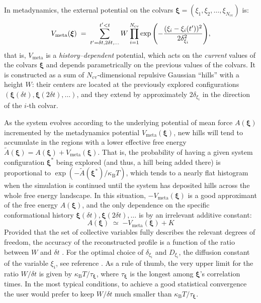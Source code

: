 In metadynamics, the external potential on the colvars $\bm{\xi} =
(\xi_{1}, \xi_{2}, \ldots, \xi_{N_{\mathrm{cv}}})$ is:
\begin{equation}
  \label{eq:colvars_meta_pot}
  V_{\mathrm{meta}}({\mbox{\boldmath{$\xi$}}}) \; = \; {
    \sum_{t' = \delta{}t, \\ 2\delta{}t, \\ \ldots}^{t'<t} W \: {
      \prod_{i = 1}^{N_{\mathrm{cv}}}
      \exp\left(-\frac{(\xi_{i}-\xi_{i}(t'))^{2}}{2\delta_{\xi_{i}}^{2}}\right)
    }
  }\mathrm{,}
\end{equation}
that is, $V_{\mathrm{meta}}$ is a \emph{history--dependent} potential,
which acts on the \emph{current} values of the colvars $\bm{\xi}$ and
depends parametrically on the previous values of the colvars.  It is
constructed as a sum of $N_{\mathrm{cv}}$-dimensional repulsive
Gaussian ``hills'' with a height $W$: their centers are located at the
previously explored configurations $\left(\bm{\xi}(\delta{}t),
  \bm{\xi}(2\delta{}t), \ldots\right)$, and they extend by
approximately $2\delta_{\xi_{i}}$ in the direction of the $i$-th
colvar.

As the system evolves according to the underlying potential of mean
force $A(\bm{\xi})$ incremented by the metadynamics potential
$V_{\mathrm{meta}}(\bm{\xi})$, new hills will tend to accumulate in
the regions with a lower effective free energy $\tilde{A}(\bm{\xi}) =
A(\bm{\xi})+V_{\mathrm{meta}}(\bm{\xi})$.  That is, the probability of
having a given system configuration $\bm{\xi^{*}}$ being explored (and
thus, a hill being added there) is proportional to
$\exp\left(-\tilde{A}(\bm{\xi^{*}})/\kappa_{\mathrm{B}}T\right)$,
which tends to a nearly flat histogram when the simulation is
continued until the system has deposited hills across the whole free
energy landscape.  In this situation, $-V_{\mathrm{meta}}(\bm{\xi})$
is a good approximant of the free energy $A(\bm{\xi})$, and the only
dependence on the specific conformational history
$\bm{\xi}(\delta{}t), \bm{\xi}(2\delta{}t), \ldots$ is by an
irrelevant additive constant:
\begin{equation}
  \label{eq:colvars_meta_fes}
  A(\bm{\xi}) \; \simeq \; {
    -V_{\mathrm{meta}}(\bm{\xi}) + K
  }
\end{equation}
Provided that the set of collective variables fully describes the
relevant degrees of freedom, the accuracy of the reconstructed profile
is a function of the ratio between $W$ and $\delta{}t$
\cite{Bussi2006}.  For the optimal choice of $\delta_{\xi_{i}}$ and
$D_{\xi_{i}}$, the diffusion constant of the variable $\xi_{i}$, see
reference \cite{Bussi2006}.  As a rule of thumb, the very upper limit
for the ratio $W/\delta{}t$ is given by
$\kappa_{\mathrm{B}}T/\tau_{\bm{\xi}}$, where $\tau_{\bm{\xi}}$ is the
longest among $\bm{\xi}$'s correlation times.  In the most typical
conditions, to achieve a good statistical convergence the user would
prefer to keep $W/\delta{}t$ much smaller than
$\kappa_{\mathrm{B}}T/\tau_{\bm{\xi}}$.

